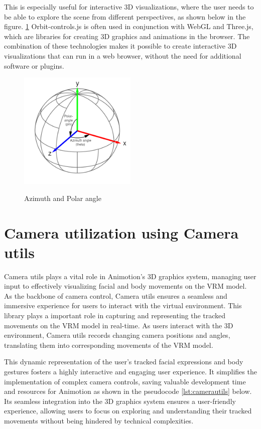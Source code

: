 This is especially useful for interactive 3D visualizations, where the user needs to be able to explore the scene from different perspectives, as shown below in the figure. \ref{fig:orbitcontrols}
Orbit-controls.js is often used in conjunction with WebGL and Three.js, which are libraries for creating 
3D graphics and animations in the browser. The combination of these technologies makes it possible to create 
interactive 3D visualizations that can run in a web browser, without the need for additional software or plugins.
\\
\begin{figure}[htb]
  \centering
  \includegraphics[width=0.5\textwidth]{pics/orbitcontrols.png}
  \caption{Azimuth and Polar angle}
  \cite{angles}
  \label{fig:orbitcontrols}
\end{figure}

\section{Camera utilization using Camera utils}
Camera utils plays a vital role in Animotion's 3D graphics system, managing user input to effectively 
visualizing facial and body movements on the VRM model. As the backbone of camera control, Camera utils 
ensures a seamless and immersive experience for users to interact with the virtual environment.
This library plays a important role in capturing and representing the tracked movements on the VRM 
model in real-time. As users interact with the 3D environment, Camera utils records changing camera 
positions and angles, translating them into corresponding movements of the VRM model. 

This dynamic representation of the user's tracked facial expressions and body gestures fosters a highly 
interactive and engaging user experience. It simplifies the implementation of complex camera controls, 
saving valuable development time and resources for Animotion as shown in the pseudocode \ref{lst:camerautils} below. Its seamless integration into the 3D 
graphics system ensures a user-friendly experience, allowing users to focus on exploring and 
understanding their tracked movements without being hindered by technical complexities. \cite{camerautils}

